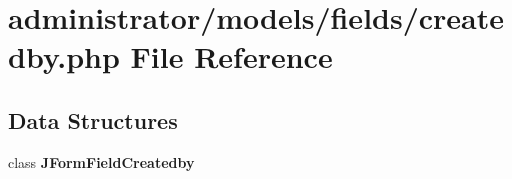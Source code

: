 \section{administrator/models/fields/createdby.php File Reference}
\label{administrator_2models_2fields_2createdby_8php}
\subsection*{Data Structures}
\begin{DoxyCompactItemize}
\item 
class \textbf{ J\+Form\+Field\+Createdby}
\end{DoxyCompactItemize}
